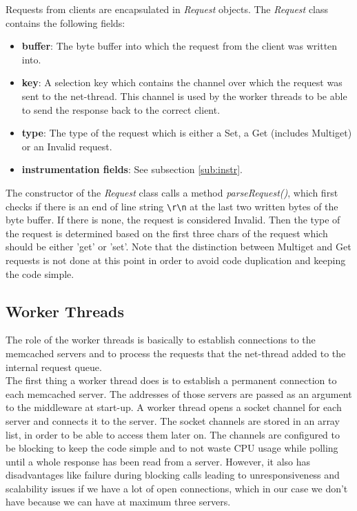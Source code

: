Requests from clients are encapsulated in \textit{Request} objects. The \textit{Request} class contains the following fields: 
\begin{itemize}
    \item \textbf{buffer}: The byte buffer into which the request from the client was written into.
    \item \textbf{key}: A selection key which contains the channel over which the request was sent to the net-thread. This channel is used by the worker threads to be able to send the response back to the correct client. 
    \item \textbf{type}: The type of the request which is either a Set, a Get (includes Multiget) or an Invalid request. 
    \item \textbf{instrumentation fields}: See subsection \ref{sub:instr}.
\end{itemize}
The constructor of the \textit{Request} class calls a method \textit{parseRequest()}, which first checks if there is an end of line string \texttt{\textbackslash r\textbackslash n} at the last two written bytes of the byte buffer. If there is none, the request is considered Invalid. Then the type of the request is determined based on the first three chars of the request which should be either 'get' or 'set'. Note that the distinction between Multiget and Get requests is not done at this point in order to avoid code duplication and keeping the code simple. 

\subsection{Worker Threads}
The role of the worker threads is basically to establish connections to the memcached servers and to process the requests that the net-thread added to the internal request queue. \\

The first thing a worker thread does is to establish a permanent connection to each memcached server. The addresses of those servers are passed as an argument to the middleware at start-up. A worker thread opens a socket channel for each server and connects it to the server. The socket channels are stored in an array list, in order to be able to access them later on. The channels are configured to be blocking to keep the code simple and to not waste CPU usage while polling until a whole response has been read from a server. However, it also has disadvantages like failure during blocking calls leading to unresponsiveness and scalability issues if we have a lot of open connections, which in our case we don't have because we can have at maximum three servers. \\


